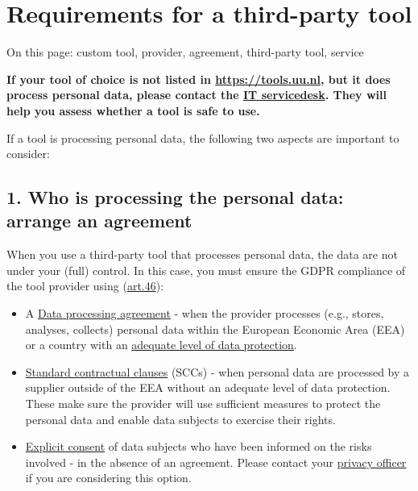 \documentclass[
]{book}
\providecommand{\tightlist}{%
  \setlength{\itemsep}{0pt}\setlength{\parskip}{0pt}}
\begin{document}
\hypertarget{tool-requirements}{%
\section{Requirements for a third-party tool}\label{tool-requirements}}

On this page: custom tool, provider, agreement, third-party tool, service

\textbf{If your tool of choice is not listed in \url{https://tools.uu.nl}, but it does
process personal data, please contact the
\href{https://www.uu.nl/en/organisation/information-and-technology-services-its/i-want-to/get-help-and-advice}{IT servicedesk}.
They will help you assess whether a tool is safe to use.}

If a tool is processing personal data, the following two aspects are important to consider:

\hypertarget{who-is-processing-the-personal-data-arrange-an-agreement}{%
\subsection{1. Who is processing the personal data: arrange an agreement}\label{who-is-processing-the-personal-data-arrange-an-agreement}}

When you use a third-party tool that processes personal data, the data are not
under your (full) control. In this case, you must ensure the GDPR compliance of
the tool provider using (\href{https://gdpr-info.eu/art-46-gdpr/}{art.46}):

\begin{itemize}
\tightlist
\item
  A \protect\hyperlink{data-processing-agreement}{Data processing agreement} -
  when the provider processes (e.g., stores, analyses, collects) personal data
  within the European Economic Area (EEA) or a country with an
  \href{https://ec.europa.eu/info/law/law-topic/data-protection/international-dimension-data-protection/adequacy-decisions_en}{adequate level of data protection}.
\item
  \protect\hyperlink{scc}{Standard contractual clauses} (SCCs) - when personal data are processed
  by a supplier outside of the EEA without an adequate level of data protection.
  These make sure the provider will use sufficient measures to protect the personal
  data and enable data subjects to exercise their rights.
\item
  \protect\hyperlink{informed-consent-forms}{Explicit consent} of data subjects who have been
  informed on the risks involved - in the absence of an agreement. Please contact your
  \protect\hyperlink{support}{privacy officer} if you are considering this option.
\end{itemize}
\end{document}
